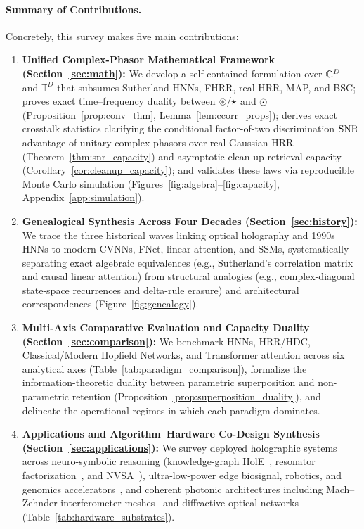 \paragraph{Summary of Contributions.}
Concretely, this survey makes five main contributions:
\begin{enumerate}
    \item \textbf{Unified Complex-Phasor Mathematical Framework (Section~\ref{sec:math}):} We develop a self-contained formulation over $\mathbb{C}^D$ and $\mathbb{T}^D$ that subsumes Sutherland HNNs, FHRR, real HRR, MAP, and BSC; proves exact time--frequency duality between $\circledast/\star$ and $\odot$ (Proposition~\ref{prop:conv_thm}, Lemma~\ref{lem:ccorr_props}); derives exact crosstalk statistics clarifying the conditional factor-of-two discrimination $\mathrm{SNR}$ advantage of unitary complex phasors over real Gaussian HRR (Theorem~\ref{thm:snr_capacity}) and asymptotic clean-up retrieval capacity (Corollary~\ref{cor:cleanup_capacity}); and validates these laws via reproducible Monte Carlo simulation (Figures~\ref{fig:algebra}--\ref{fig:capacity}, Appendix~\ref{app:simulation}).
    \item \textbf{Genealogical Synthesis Across Four Decades (Section~\ref{sec:history}):} We trace the three historical waves linking optical holography and 1990s HNNs to modern CVNNs, FNet, linear attention, and SSMs, systematically separating exact algebraic equivalences (e.g., Sutherland's correlation matrix and causal linear attention) from structural analogies (e.g., complex-diagonal state-space recurrences and delta-rule erasure) and architectural correspondences (Figure~\ref{fig:genealogy}).
    \item \textbf{Multi-Axis Comparative Evaluation and Capacity Duality (Section~\ref{sec:comparison}):} We benchmark HNNs, HRR/HDC, Classical/Modern Hopfield Networks, and Transformer attention across six analytical axes (Table~\ref{tab:paradigm_comparison}), formalize the information-theoretic duality between parametric superposition and non-parametric retention (Proposition~\ref{prop:superposition_duality}), and delineate the operational regimes in which each paradigm dominates.
    \item \textbf{Applications and Algorithm--Hardware Co-Design Synthesis (Section~\ref{sec:applications}):} We survey deployed holographic systems across neuro-symbolic reasoning (knowledge-graph HolE~\cite{NICKEL_2016_HOLE}, resonator factorization~\cite{FRADY_2020_RESONATOR,KENT_2020_RESONATOR}, and NVSA~\cite{HERSCHE_2023_NVSA}), ultra-low-power edge biosignal, robotics, and genomics accelerators~\cite{RAHIMI_HDC_EDGE,NEUBERT_2019_HDC_ROBOTICS,KIM_2020_GENIEHD,KARUNARATNE_2020_PCM_HDC}, and coherent photonic architectures including Mach--Zehnder interferometer meshes~\cite{SHEN_PHOTONIC_MZI,CLEMENTS_2016_MZI} and diffractive optical networks~\cite{LIN_DIFFRACTIVE_OPTICAL_NN} (Table~\ref{tab:hardware_substrates}).

\end{enumerate}
